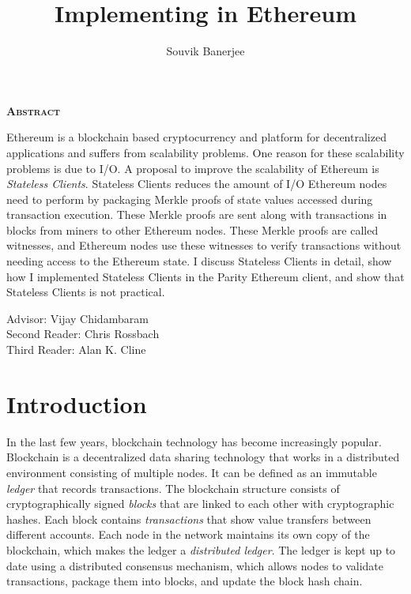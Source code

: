 \documentclass[12pt]{article}
\title{Implementing \System in Ethereum}
\author{Souvik Banerjee}
\date{}
\newcommand{\System}{Stateless Clients\xspace}
\begin{document}
\maketitle
\thispagestyle{empty}

\begin{center}
  \textsc{\textbf{Abstract}}
\end{center}

Ethereum is a blockchain based cryptocurrency and platform for decentralized applications and suffers from scalability problems. One reason for these scalability problems is due to I/O. A proposal to improve the scalability of Ethereum is \emph{\System}. \System reduces the amount of I/O Ethereum nodes need to perform by packaging Merkle proofs of state values accessed during transaction execution. These Merkle proofs are sent along with transactions in blocks from miners to other Ethereum nodes. These Merkle proofs are called witnesses, and Ethereum nodes use these witnesses to verify transactions without needing access to the Ethereum state. I discuss \System in detail, show how I implemented \System in the Parity Ethereum client, and show that \System is not practical.

\par\bigskip\noindent\vspace{3in}
\begin{center}
  Advisor: Vijay Chidambaram \\
  Second Reader: Chris Rossbach \\
  Third Reader: Alan K. Cline \\
\end{center}

\newpage
\thispagestyle{empty}
\tableofcontents
\newpage


\section{Introduction} \label{section:introduction}


In the last few years, blockchain technology has become increasingly popular.
Blockchain is a decentralized data sharing technology that works in a distributed environment consisting of multiple nodes. It can be defined as an immutable \emph{ledger} that records transactions. The blockchain structure consists of cryptographically signed \emph{blocks} that are linked to each other with cryptographic hashes. Each block contains \emph{transactions} that show value transfers between different accounts. Each node in the network maintains its own copy of the blockchain, which makes the ledger a \emph{distributed ledger}. The ledger is kept up to date using a distributed consensus mechanism, which allows nodes to validate transactions, package them into blocks, and update the block hash chain.
\end{document}
